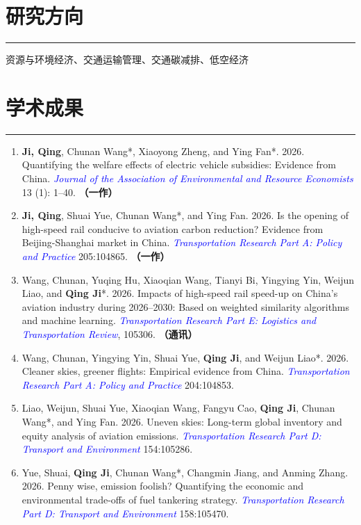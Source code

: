 \documentclass[letterpaper]{article}
\newcommand{\journal}[1]{\textcolor{blue}{\textit{#1}}}
\renewenvironment{itemize}{
  \begin{list}{}{
    \setlength{\leftmargin}{0.2in}
    \setlength{\itemsep}{0.1in}
    \setlength{\parskip}{0.025in}
    \setlength{\parsep}{0.025in}
  }
}{
  \end{list}
}
\begin{document}
\section*{研究方向}
\hrule
\vspace{0.25cm}
  \begin{itemize}
    \item 资源与环境经济、交通运输管理、交通碳减排、低空经济
  \end{itemize}


\section*{学术成果}
\hrule
\vspace{0.25cm}
  \begin{enumerate}
    \item \textbf{Ji, Qing}, Chunan Wang*, Xiaoyong Zheng, and Ying Fan*. 2026. Quantifying the welfare effects of electric vehicle subsidies: Evidence from China. \journal{Journal of the Association of Environmental and Resource Economists} 13 (1): 1--40. \textbf{（一作）}
    \item \textbf{Ji, Qing}, Shuai Yue, Chunan Wang*, and Ying Fan. 2026. Is the opening of high-speed rail conducive to aviation carbon reduction? Evidence from Beijing-Shanghai market in China. \journal{Transportation Research Part A: Policy and Practice} 205:104865. \textbf{（一作）}
    \item Wang, Chunan, Yuqing Hu, Xiaoqian Wang, Tianyi Bi, Yingying Yin, Weijun Liao, and \textbf{Qing Ji}*. 2026. Impacts of high-speed rail speed-up on China's aviation industry during 2026--2030: Based on weighted similarity algorithms and machine learning. \journal{Transportation Research Part E: Logistics and Transportation Review}, 105306. \textbf{（通讯）}
    \item Wang, Chunan, Yingying Yin, Shuai Yue, \textbf{Qing Ji}, and Weijun Liao*. 2026. Cleaner skies, greener flights: Empirical evidence from China. \journal{Transportation Research Part A: Policy and Practice} 204:104853.
    \item Liao, Weijun, Shuai Yue, Xiaoqian Wang, Fangyu Cao, \textbf{Qing Ji}, Chunan Wang*, and Ying Fan. 2026. Uneven skies: Long-term global inventory and equity analysis of aviation emissions. \journal{Transportation Research Part D: Transport and Environment} 154:105286.
    \item Yue, Shuai, \textbf{Qing Ji}, Chunan Wang*, Changmin Jiang, and Anming Zhang. 2026. Penny wise, emission foolish? Quantifying the economic and environmental trade-offs of fuel tankering strategy. \journal{Transportation Research Part D: Transport and Environment} 158:105470.

\end{enumerate}
\end{document}
